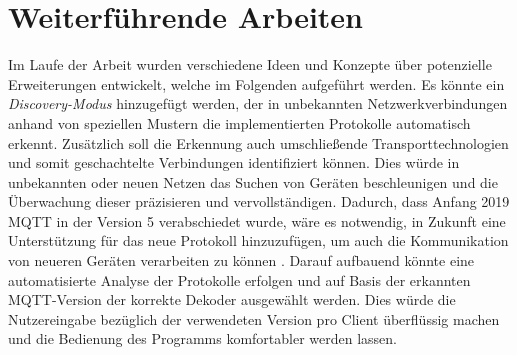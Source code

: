\section{Weiterführende Arbeiten}
Im Laufe der Arbeit wurden verschiedene Ideen und Konzepte über potenzielle Erweiterungen entwickelt, welche im Folgenden aufgeführt werden.
Es könnte ein \emph{Discovery-Modus} hinzugefügt werden, der in unbekannten Netzwerkverbindungen anhand von speziellen Mustern die implementierten Protokolle automatisch erkennt. Zusätzlich soll die Erkennung auch umschließende Transporttechnologien und somit geschachtelte Verbindungen identifiziert können. Dies würde in unbekannten oder neuen Netzen das Suchen von Geräten beschleunigen und die Überwachung dieser präzisieren und vervollständigen.
Dadurch, dass Anfang 2019 MQTT in der Version 5 verabschiedet wurde, wäre es notwendig, in Zukunft eine Unterstützung für das neue Protokoll hinzuzufügen, um auch die Kommunikation von neueren Geräten verarbeiten zu können \cite{mqtt_org_2019}.
Darauf aufbauend könnte eine automatisierte Analyse der Protokolle erfolgen und auf Basis der erkannten \ac{MQTT}-Version der korrekte Dekoder ausgewählt werden. Dies würde die Nutzereingabe bezüglich der verwendeten Version pro Client überflüssig machen und die Bedienung des Programms komfortabler werden lassen.
